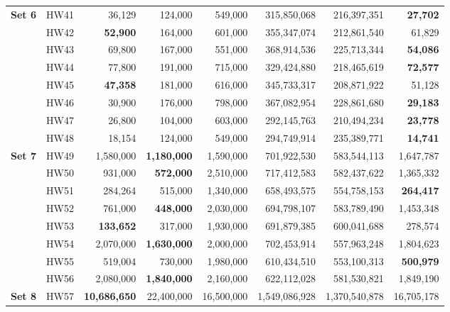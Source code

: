 \documentclass[]{interact}
\begin{document}
\begin{table}[htp]
{\begin{tabular}{l|r|r|r|r|r|r|r}
\multirow{8}{*}{\textbf{Set 6}} 
& HW41               & 36,129        & 124,000         & 549,000         & 315,850,068   & 216,397,351   & \textbf{27,702}       \\ 
& HW42               & \textbf{52,900}        & 164,000         & 601,000         & 355,347,074   & 212,861,540   & {61,829}       \\ 
& HW43               & 69,800        & 167,000         & 551,000         & 368,914,536   & 225,713,344   & \textbf{54,086}       \\ 
& HW44               & 77,800        & 191,000         & 715,000         & 329,424,880   & 218,465,619   & \textbf{72,577}       \\ 
& HW45               & \textbf{47,358}        & 181,000         & 616,000         & 345,733,317   & 208,871,922   & {51,128}       \\  
& HW46               & 30,900        & 176,000         & 798,000         & 367,082,954   & 228,861,680   & \textbf{29,183}       \\ 
    & HW47 & 26,800 & 104,000 & 603,000 & 292,145,763 & 210,494,234 & \textbf{23,778} \\ 
    & HW48 & 18,154 & 124,000 & 549,000 & 294,749,914 & 235,389,771 & \textbf{14,741} \\ 
    \hline 
   \multirow{8}{*}{\textbf{Set 7}} 
    & HW49 & 1,580,000 & \textbf{1,180,000} & 1,590,000 & 701,922,530 & 583,544,113 & 1,647,787 \\ 
     & HW50 & 931,000 & \textbf{572,000} & 2,510,000 & 717,412,583 & 582,437,622 & 1,365,332 \\ 
     & HW51 & {284,264} & 515,000 & 1,340,000 & 658,493,575 & 554,758,153 & \textbf{264,417} \\ 
    & HW52 & 761,000 & \textbf{448,000} & 2,030,000 & 694,798,107 & 583,789,490 & 1,453,348 \\ 
    & HW53 & \textbf{133,652} & 317,000 & 1,930,000 & 691,879,385 & 600,041,688 & 278,574 \\ 
     & HW54 & 2,070,000 & \textbf{1,630,000} & 2,000,000 & 702,453,914 & 557,963,248 & 1,804,623 \\ 
     & HW55 & {519,004} & 730,000 & 1,980,000 & 610,434,510 & 553,100,313 & \textbf{500,979} \\ 
     & HW56 & 2,080,000 & \textbf{1,840,000} & 2,160,000 & 622,112,028 & 581,530,821 & 1,849,190 \\ 
    \hline 
    \multirow{8}{*}{\textbf{Set 8}} 
    & HW57 & \textbf{10,686,650} & 22,400,000 & 16,500,000 & 1,549,086,928 & 1,370,540,878 & {16,705,178} \\ 

\end{tabular}}
\end{table}
\end{document}
